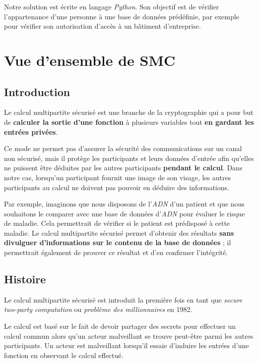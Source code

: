 \documentclass[12pt,a4paper]{article}
\begin{document}
Notre solution est écrite en langage \textit{Python}. Son objectif est de vérifier l'appartenance d'une personne à une base de données prédéfinie, par exemple pour vérifier son autorisation d'accès à un bâtiment d'entreprise.

\newpage
\section{Vue d'ensemble de SMC}

\subsection{Introduction}

Le calcul multipartite sécurisé est une branche de la cryptographie qui a pour but de \textbf{calculer la sortie d’une fonction} à plusieurs variables tout \textbf{en gardant les entrées privées}.

Ce mode ne permet pas d’assurer la sécurité des communications sur un canal non sécurisé, mais il protège les participants et leurs données d’entrée afin qu'elles ne puissent être déduites par les autres participants \textbf{pendant le calcul}.
Dans notre cas, lorsqu’un participant fournit une image de son visage, les autres participants au calcul ne doivent pas pouvoir en déduire des informations.

Par exemple, imaginons que nous disposons de l’\textit{ADN} d’un patient et que nous souhaitons le comparer avec une base de données d’\textit{ADN} pour évaluer le risque de maladie. Cela permettrait de vérifier si le patient est prédisposé à cette maladie. Le calcul multipartite sécurisé permet d'obtenir des résultats \textbf{sans divulguer d’informations sur le contenu de la base de données} ; il permettrait également de prouver ce résultat et d’en confirmer l’intégrité.
\subsection{Histoire}
Le calcul multipartite sécurisé est introduit la première fois en tant que \textit{secure two-party computation} ou \textit{problème des millionnaires} en 1982.

Le calcul est basé sur le fait de devoir partager des secrets pour effectuer un calcul commun alors qu’un acteur malveillant se trouve peut-être parmi les autres participants. Un acteur est malveillant lorsqu’il essaie d’induire les entrées d'une fonction en observant le calcul effectué.
\end{document}
